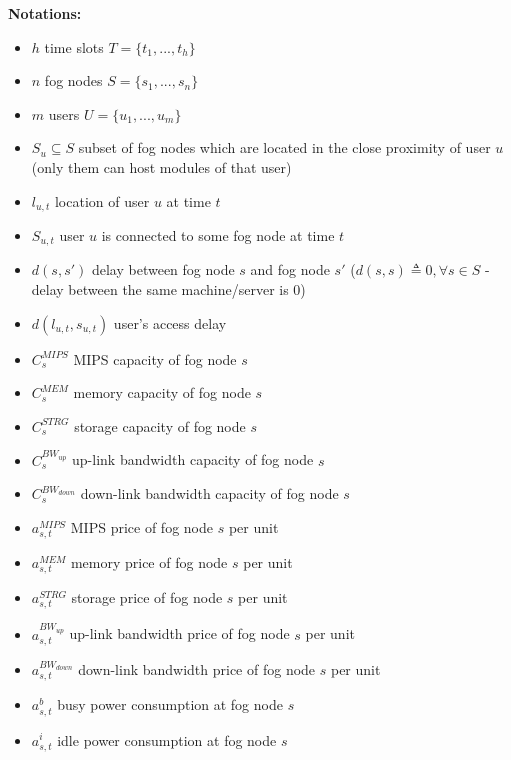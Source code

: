 \documentclass{article}
\begin{document}
\vspace{12pt}
\noindent\textbf{Notations:}\\[6pt]
\begin{itemize}
    \item $h$ time slots $T=\{t_1, ..., t_h\}$
    \item $n$ fog nodes $S=\{s_1, ..., s_n\}$
    \item $m$ users $U=\{u_1, ..., u_m\}$
    \item $S_u \subseteq S$ subset of fog nodes which are located in the close proximity of user $u$ (only them can host modules of that user)\\
    
    \item $l_{u,t}$ location of user $u$ at time $t$
    \item $S_{u,t}$ user $u$ is connected to some fog node at time $t$
    \item $d(s, s')$ delay between fog node $s$ and fog node $s'$ ($d(s, s) \triangleq 0, \forall s \in S$ - delay between the same machine/server is 0)
    \item $d(l_{u,t}, s_{u,t})$ user's access delay\\
    
    \item $C^{MIPS}_{s}$ MIPS capacity of fog node $s$
    \item $C^{MEM}_{s}$ memory capacity of fog node $s$
    \item $C^{STRG}_{s}$ storage capacity of fog node $s$
    \item $C^{BW_{up}}_{s}$ up-link bandwidth capacity of fog node $s$
    \item $C^{BW_{down}}_{s}$ down-link bandwidth capacity of fog node $s$\\
    
    \item $a^{MIPS}_{s,t}$ MIPS price of fog node $s$ per unit
    \item $a^{MEM}_{s,t}$ memory price of fog node $s$ per unit
    \item $a^{STRG}_{s,t}$ storage price of fog node $s$ per unit
    \item $a^{BW_{up}}_{s,t}$ up-link bandwidth price of fog node $s$ per unit
    \item $a^{BW_{down}}_{s,t}$ down-link bandwidth price of fog node $s$ per unit
    \item $a^b_{s,t}$ busy power consumption at fog node $s$
    \item $a^i_{s,t}$ idle power consumption at fog node $s$\\
    

\end{itemize}
\end{document}
